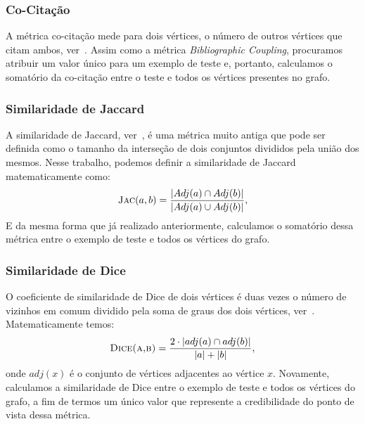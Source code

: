 \subsubsection{Co-Citação}
\label{subsubsection::cocitation}
A métrica co-citação mede para dois vértices, o número de outros vértices que citam ambos, ver~\cite{Small73}. Assim como a métrica \textit{Bibliographic Coupling}, procuramos atribuir um valor único para um exemplo de teste e, portanto, calculamos o somatório da co-citação entre o teste e todos os vértices presentes no grafo.

\subsubsection{Similaridade de Jaccard}
\label{subsubsection::jaccard}

A similaridade de Jaccard, ver~\cite{Jaccard01}, é uma métrica muito antiga que pode ser definida como o tamanho da interseção de dois conjuntos divididos pela união dos mesmos. Nesse trabalho, podemos definir a similaridade de Jaccard matematicamente como:
\begin{equation}
\textsc{Jac}(a, b) =  \frac{|Adj(a) \cap Adj(b)|}{|Adj(a) \cup Adj(b)|},
\end{equation}
E da mesma forma que já realizado anteriormente, calculamos o somatório dessa métrica entre o exemplo de teste e todos os vértices do grafo.


\subsubsection{Similaridade de Dice}
\label{subsubsection::dice}

O coeficiente de similaridade de Dice de dois vértices é duas vezes o número de vizinhos em comum dividido pela soma de graus dos dois vértices, ver~\cite{Dice45}. Matematicamente temos:
\begin{equation}
\textsc{Dice(a,b)} = \frac{2 \cdot | adj(a) \cap adj(b) | }{| a | + | b |},
\end{equation}
onde $adj(x)$ é o conjunto de vértices adjacentes ao vértice $x$. Novamente, calculamos a similaridade de Dice entre o exemplo de teste e todos os vértices do grafo, a fim de termos um único valor que represente a credibilidade do ponto de vista dessa métrica.

